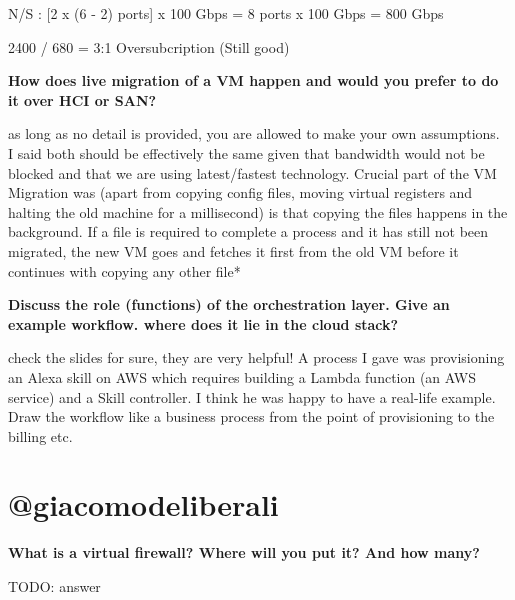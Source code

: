 N/S : {[}2 x (6 - 2) ports{]} x 100 Gbps = 8 ports x 100 Gbps = 800 Gbps

2400 / 680 = 3:1 Oversubcription (Still good)

\textbf{How does live migration of a VM happen and would you prefer to
do it over HCI or SAN?}

as long as no detail is provided, you are allowed to make your own
assumptions.\\
I said both should be effectively the same given that bandwidth would
not be blocked and that we are using latest/fastest technology. Crucial
part of the VM Migration was (apart from copying config files, moving
virtual registers and halting the old machine for a millisecond) is that
copying the files happens in the background. If a file is required to
complete a process and it has still not been migrated, the new VM goes
and fetches it first from the old VM before it continues with copying
any other file*\\

\textbf{Discuss the role (functions) of the orchestration layer. Give an
example workflow. where does it lie in the cloud stack?}

check the slides for sure, they are very helpful! A process I gave was
provisioning an Alexa skill on AWS which requires building a Lambda
function (an AWS service) and a Skill controller. I think he was happy
to have a real-life example. Draw the workflow like a business process
from the point of provisioning to the billing etc.

\hypertarget{giacomodeliberali}{%
\section{@giacomodeliberali}\label{giacomodeliberali}}

\textbf{What is a virtual firewall? Where will you put it? And how
many?}

TODO: answer


